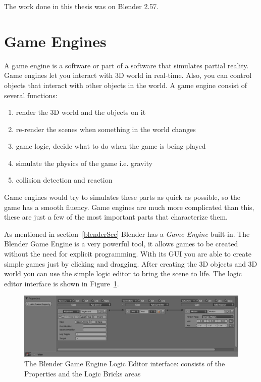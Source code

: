 The work done in this thesis was on Blender 2.57.

\section{Game Engines}

A game engine is a software or part of a software that simulates partial reality\cite{bookGameKit2}. Game engines let you interact with 3D world in real-time. Also, you can control objects that interact with other objects in the world. A game engine consist of several functions:
\begin{enumerate}
\item{render the 3D world and the objects on it}
\item{re-render the scenes when something in the world changes}
\item{game logic, decide what to do when the game is being played}
\item{simulate the physics of the game i.e. gravity}
\item{collision detection and reaction}
\end{enumerate}

Game engines would try to simulates these parts as quick as possible, so the game has a smooth fluency. Game engines are much more complicated than this, these are just a few of the most important parts that characterize them.

As mentioned in section~\ref{blenderSec} Blender has a \textit{Game Engine} built-in. The Blender Game Engine is a very powerful tool, it allows games to be created without  the need for explicit programming. With its GUI you are able to create simple games just by clicking and dragging. After creating the 3D objects and 3D world you can use the simple logic editor to bring the scene to life. The logic editor interface is shown in Figure~\ref{logic}.

\begin{figure}[htbp]
\begin{center}
\includegraphics[scale=0.4]{figures/logic.pdf}
\caption{The Blender Game Engine Logic Editor interface: consists of the Properties and the Logic Bricks areas}
\label{logic}
\end{center}
\end{figure}

